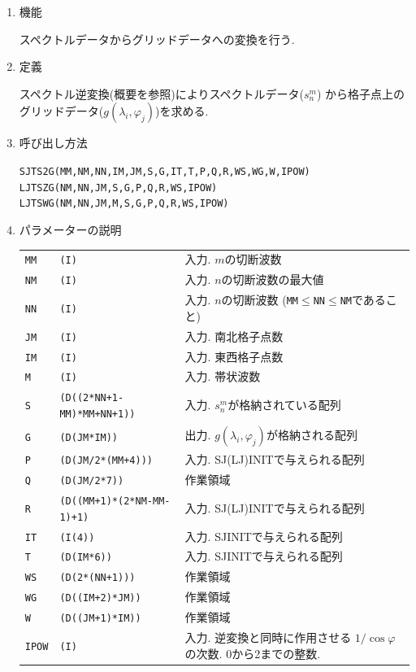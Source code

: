 \documentclass[a4j]{jarticle}
\begin{document}
\begin{enumerate}

\item 機能 

スペクトルデータからグリッドデータへの変換を行う.

\item 定義

スペクトル逆変換(概要を参照)によりスペクトルデータ($s^m_n$)
から格子点上のグリッドデータ($g(\lambda_i,\varphi_j)$)を求める.

\item 呼び出し方法 

{\tt SJTS2G(MM,NM,NN,IM,JM,S,G,IT,T,P,Q,R,WS,WG,W,IPOW)}\\
{\tt LJTSZG(NM,NN,JM,S,G,P,Q,R,WS,IPOW)}\\
{\tt LJTSWG(NM,NN,JM,M,S,G,P,Q,R,WS,IPOW)}
  
\item パラメーターの説明

\begin{tabular}{lll}
{\tt MM} & {\tt (I)} & 入力. $m$の切断波数\\
{\tt NM} & {\tt (I)} & 入力. $n$の切断波数の最大値\\
{\tt NN} & {\tt (I)} & 入力. $n$の切断波数
({\tt MM}$\le${\tt NN}$\le${\tt NM}であること)\\
{\tt JM} & {\tt (I)} & 入力. 南北格子点数\\
{\tt IM} & {\tt (I)} & 入力. 東西格子点数\\
{\tt M} & {\tt (I)} & 入力. 帯状波数\\
{\tt S} & {\tt (D((2*NN+1-MM)*MM+NN+1))} & 入力. $s^m_n$が格納されている配列\\
{\tt G} & {\tt (D(JM*IM))} & 出力. $g(\lambda_i,\varphi_j)$が格納される配列\\
{\tt P} & {\tt (D(JM/2*(MM+4)))} & 入力. SJ(LJ)INITで与えられる配列\\
{\tt Q} & {\tt (D(JM/2*7))} & 作業領域\\
{\tt R} & {\tt (D((MM+1)*(2*NM-MM-1)+1)} & 入力. SJ(LJ)INITで与えられる配列\\
{\tt IT} & {\tt (I(4))} & 入力. SJINITで与えられる配列\\
{\tt T} & {\tt (D(IM*6))} & 入力. SJINITで与えられる配列\\
{\tt WS} & {\tt (D(2*(NN+1)))} & 作業領域\\
{\tt WG} & {\tt (D((IM+2)*JM))} & 作業領域\\
{\tt W} & {\tt (D((JM+1)*IM))} & 作業領域\\
{\tt IPOW} & {\tt (I)} & 入力. 逆変換と同時に作用させる
                      $1/\cos\varphi$の次数. 0から2までの整数.
\end{tabular}


\end{enumerate}
\end{document}
